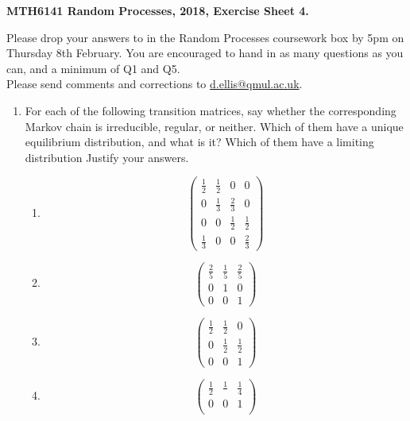\documentclass[11pt,a4paper]{report}
\begin{document}
    \textbf{MTH6141 Random Processes, 2018, Exercise Sheet 4.}\par
    Please drop your answers to in the Random Processes coursework box by 5pm on Thursday 8th February. You are encouraged to hand in as many questions as you can, and a minimum of Q1 and Q5.\\
    Please send comments and corrections to \href{d.ellis@qmul.ac.uk}{d.ellis@qmul.ac.uk}.
    \begin{enumerate}
        \item For each of the following transition matrices, say whether the corresponding Markov chain is irreducible, regular, or neither. Which of them have a unique equilibrium distribution, and what is it? Which of them have a limiting distribution Justify your answers.
        \begin{enumerate}
            \item
            $$
            \begin{pmatrix}
                \frac{1}{2} & \frac{1}{2} & 0 & 0\\
                0 & \frac{1}{3} & \frac{2}{3} & 0\\
                0 & 0 & \frac{1}{2} & \frac{1}{2}\\
                \frac{1}{3} & 0 & 0 & \frac{2}{3}
            \end{pmatrix}
            $$
            \item
            $$
            \begin{pmatrix}
                \frac{2}{5} & \frac{1}{5} & \frac{2}{5}\\
                0 & 1 & 0\\
                0 & 0 & 1
            \end{pmatrix}
            $$
            \item
            $$
            \begin{pmatrix}
                \frac{1}{2} & \frac{1}{2} & 0\\
                0 & \frac{1}{2} & \frac{1}{2}\\
                0 & 0 & 1
            \end{pmatrix}
            $$
            \item
            $$
            \begin{pmatrix}
                \frac{1}{2} & \frac{1}{} & \frac{1}{4}\\
                0 & 0 & 1\\

\end{pmatrix}$$
\end{enumerate}
\end{enumerate}
\end{document}
